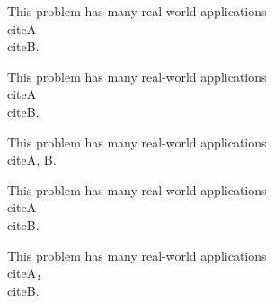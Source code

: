 This problem has many real-world applications~\\cite{A}\\cite{B}.

This problem has many real-world applications~\\cite{A} \\cite{B}.

This problem has many real-world applications~\\cite{A, B}.

This problem has many real-world applications~\\cite{A}~\\cite{B}.

This problem has many real-world applications~\\cite{A}，\\cite{B}.

